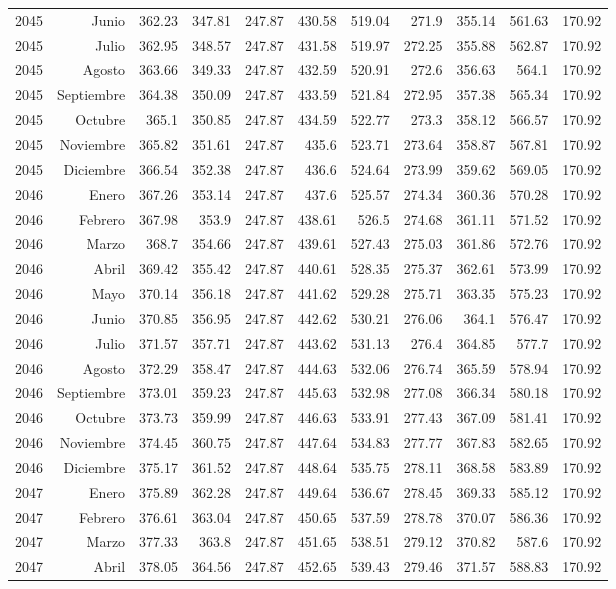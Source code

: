 \documentclass{article}%
\begin{document}
\begin{longtable}{|l r|r|r|r|r|r|r|r|r|r|}
2045&Junio&362.23&347.81&247.87&430.58&519.04&271.9&355.14&561.63&170.92\\%
2045&Julio&362.95&348.57&247.87&431.58&519.97&272.25&355.88&562.87&170.92\\%
2045&Agosto&363.66&349.33&247.87&432.59&520.91&272.6&356.63&564.1&170.92\\%
2045&Septiembre&364.38&350.09&247.87&433.59&521.84&272.95&357.38&565.34&170.92\\%
2045&Octubre&365.1&350.85&247.87&434.59&522.77&273.3&358.12&566.57&170.92\\%
2045&Noviembre&365.82&351.61&247.87&435.6&523.71&273.64&358.87&567.81&170.92\\%
2045&Diciembre&366.54&352.38&247.87&436.6&524.64&273.99&359.62&569.05&170.92\\%
2046&Enero&367.26&353.14&247.87&437.6&525.57&274.34&360.36&570.28&170.92\\%
2046&Febrero&367.98&353.9&247.87&438.61&526.5&274.68&361.11&571.52&170.92\\%
2046&Marzo&368.7&354.66&247.87&439.61&527.43&275.03&361.86&572.76&170.92\\%
2046&Abril&369.42&355.42&247.87&440.61&528.35&275.37&362.61&573.99&170.92\\%
2046&Mayo&370.14&356.18&247.87&441.62&529.28&275.71&363.35&575.23&170.92\\%
2046&Junio&370.85&356.95&247.87&442.62&530.21&276.06&364.1&576.47&170.92\\%
2046&Julio&371.57&357.71&247.87&443.62&531.13&276.4&364.85&577.7&170.92\\%
2046&Agosto&372.29&358.47&247.87&444.63&532.06&276.74&365.59&578.94&170.92\\%
2046&Septiembre&373.01&359.23&247.87&445.63&532.98&277.08&366.34&580.18&170.92\\%
2046&Octubre&373.73&359.99&247.87&446.63&533.91&277.43&367.09&581.41&170.92\\%
2046&Noviembre&374.45&360.75&247.87&447.64&534.83&277.77&367.83&582.65&170.92\\%
2046&Diciembre&375.17&361.52&247.87&448.64&535.75&278.11&368.58&583.89&170.92\\%
2047&Enero&375.89&362.28&247.87&449.64&536.67&278.45&369.33&585.12&170.92\\%
2047&Febrero&376.61&363.04&247.87&450.65&537.59&278.78&370.07&586.36&170.92\\%
2047&Marzo&377.33&363.8&247.87&451.65&538.51&279.12&370.82&587.6&170.92\\%
2047&Abril&378.05&364.56&247.87&452.65&539.43&279.46&371.57&588.83&170.92\\%

\end{longtable}
\end{document}
